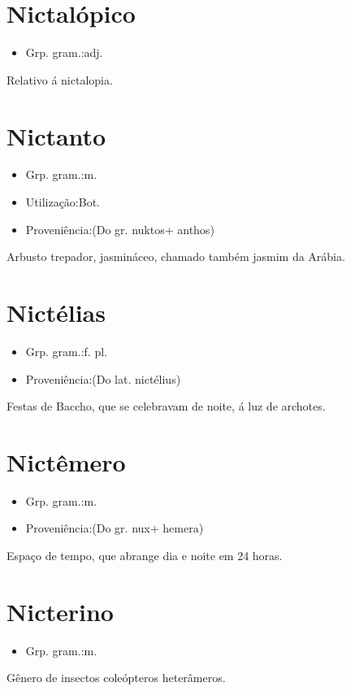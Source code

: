 \section{Nictalópico}
\begin{itemize}
\item {Grp. gram.:adj.}
\end{itemize}
Relativo á nictalopia.
\section{Nictanto}
\begin{itemize}
\item {Grp. gram.:m.}
\end{itemize}
\begin{itemize}
\item {Utilização:Bot.}
\end{itemize}
\begin{itemize}
\item {Proveniência:(Do gr. \textunderscore nuktos\textunderscore  + \textunderscore anthos\textunderscore )}
\end{itemize}
Arbusto trepador, jasmináceo, chamado também \textunderscore jasmim da Arábia\textunderscore .
\section{Nictélias}
\begin{itemize}
\item {Grp. gram.:f. pl.}
\end{itemize}
\begin{itemize}
\item {Proveniência:(Do lat. \textunderscore nictélius\textunderscore )}
\end{itemize}
Festas de Baccho, que se celebravam de noite, á luz de archotes.
\section{Nictêmero}
\begin{itemize}
\item {Grp. gram.:m.}
\end{itemize}
\begin{itemize}
\item {Proveniência:(Do gr. \textunderscore nux\textunderscore  + \textunderscore hemera\textunderscore )}
\end{itemize}
Espaço de tempo, que abrange dia e noite em 24 horas.
\section{Nicterino}
\begin{itemize}
\item {Grp. gram.:m.}
\end{itemize}
Gênero de insectos coleópteros heterâmeros.
